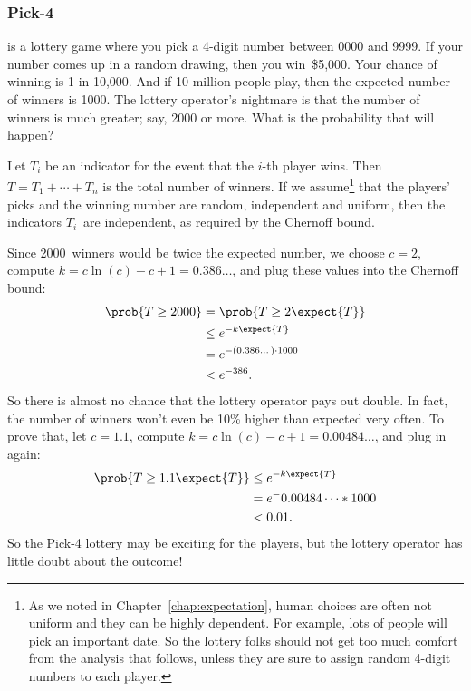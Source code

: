 \subsubsection{Pick-4}

 is a lottery game where you pick a 4-digit number between
0000 and 9999.  If your number comes up in a random drawing, then you
win~\$5,000.  Your chance of winning is 1 in 10,000.  And if 10
million people play, then the expected number of winners is 1000.  The
lottery operator's nightmare is that the number of winners is much
greater; say, 2000 or more.  What is the probability that will happen?

Let $T_i$ be an indicator for the event that the $i$-th player wins.
Then $T = T_1 + \cdots + T_n$ is the total number of winners.  If we
assume\footnote{As we noted in Chapter~\ref{chap:expectation}, human
  choices are often not uniform and they can be highly dependent.  For
  example, lots of people will pick an important date.  So the lottery
  folks should not get too much comfort from the analysis that
  follows, unless they are sure to assign random 4-digit numbers to
  each player.} that the players' picks and the winning number are
random, independent and uniform, then the indicators $T_i$~are
independent, as required by the Chernoff bound.


Since 2000~winners would be twice the expected number, we choose $c =
2$, compute $k = c \ln(c) - c + 1 = 0.386\dots$, and plug these values
into the Chernoff bound:
\begin{align*}
\prob{T \geq 2000} & = \prob{T \geq 2 \expect{T}} \\
  & \leq e^{-k \expect{T}} \\
  & = e^{- (0.386\dots) \cdot 1000} \\
  & < e^{-386}.
\end{align*}
So there is almost no chance that the lottery operator pays out
double.  In fact, the number of winners won't even be 10\% higher than
expected very often.  To prove that, let $c = 1.1$, compute $k = c
\ln(c) - c + 1 = 0.00484\dots$, and plug in again:
\begin{align*}
\prob{T \geq 1.1 \expect{T}} & \leq e^{-k \expect{T}} \\
  & = e^- 0.00484\dots * 1000 \\
  & < 0.01.
\end{align*}
So the Pick-4 lottery may be exciting for the players, but the lottery
operator has little doubt about the outcome!


